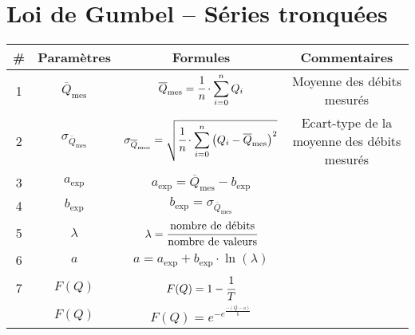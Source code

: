 \section{Loi de Gumbel -- Séries tronquées}
\begin{table}[H]
    \centering
    \begin{tabular}{c|c|c|c}
        \# & \textbf{Paramètres}                & \textbf{Formules}                                                                                                                         & \textbf{Commentaires}      \\
        \hline
        1  & $\overline{Q}_\text{mes}$          & $\overline{Q}_\text{mes} = \cfrac{1}{n} \cdot \displaystyle{\sum_{i=0}^{n} Q_i}$                                                          & Moyenne des débits mesurés \\
        \hline
        2  & $\sigma_{\overline{Q}_\text{mes}}$ & $\sigma_{\overline{Q}_\text{mes}} = \sqrt{\cfrac{1}{n} \cdot \displaystyle{\sum_{i=0}^{n} \left(Q_i - \overline{Q}_\text{mes}\right)^2}}$ & Ecart-type de la moyenne des débits mesurés \\
        \hline
        3  & $a_\text{exp}$                     & $a_\text{exp} = \overline{Q}_\text{mes} - b_\text{exp}$                                                                                   & \\
        \hline
        4  & $b_\text{exp}$                     & $b_\text{exp} = \sigma_{\overline{Q}_\text{mes}}$                                                                                         & \\
        \hline
        5  & $\lambda$                          & $\lambda = \cfrac{\text{nombre de débits}}{\text{nombre de valeurs}}$                                                                     & \\                                               
        \hline
        6  & $a$                                & $a = a_\text{exp} + b_\text{exp} \cdot \ln \left(\lambda\right)$                                                                          & \\                                                                                         
        \hline
        7  & $F(Q)$                             & $F(Q) = 1-\cfrac{1}{T}$                                                                                                                   & \\
        \hdashline                   
        8  & $F(Q)$                             & $F(Q) = e^{-e^{\frac{- \left(Q-a\right)}{b}}}$                                                                                            & \\

\end{tabular}
\end{table}
